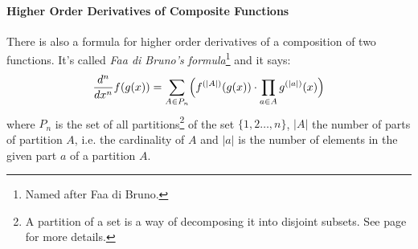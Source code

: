 


\paragraph{Higher Order Derivatives of Composite Functions}
There is also a formula for higher order derivatives of a composition of two functions. It's called \emph{Faa di Bruno's formula}\footnote{Named after Faa di Bruno.} and it says:
\begin{equation}
\frac{d^n}{d x^n} f(g(x)) = 
\sum_{A \in P_n} 
\Bigl(
f^{(|A|)}(g(x)) \cdot \prod_{a \in A} g^{(|a|)}(x) 
\Bigr)
\end{equation}
where $P_n$ is the set of all partitions\footnote{A partition of a set is a way of decomposing it into disjoint subsets. See page \pageref{Sec:PartitionsOfSets} for more details.} of the set $\{1,2\ldots,n\}$, $|A|$ the number of parts of partition $A$, i.e. the cardinality of $A$ and $|a|$ is the number of elements in the given part $a$ of a partition $A$. 

